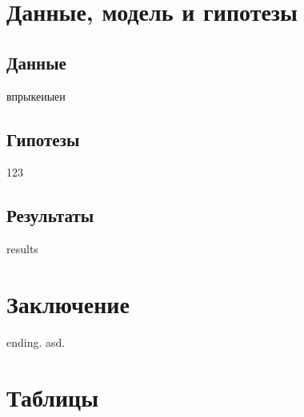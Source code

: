 \documentclass[a4paper,12pt]{article}
\begin{document}
\clearpage
\section{Данные, модель и гипотезы}

\subsection{Данные}

впрыкеиыеи

\subsection{Гипотезы}

123

\subsection{Результаты}

results

\clearpage
\section{Заключение}

ending. \cite{anderson_internal_1980}
asd. \cite{leasure_internal_1968}

%
%

\clearpage



	
\clearpage\appendix
\section{Таблицы}


\clearpage
\end{document}
